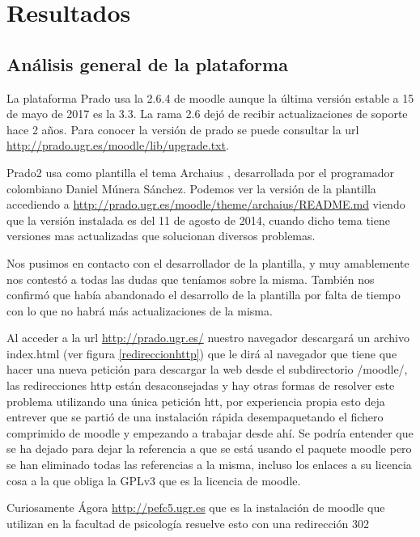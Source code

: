 \chapter{Resultados}

\section{Análisis general de la plataforma}

La plataforma Prado usa la 2.6.4 de moodle aunque la última versión estable a 15 de mayo de 2017 es la 3.3. La rama 2.6 dejó de recibir actualizaciones de soporte hace 2 años. Para conocer la versión de prado se puede consultar la url \url{http://prado.ugr.es/moodle/lib/upgrade.txt}.

\bigskip
Prado2 usa como plantilla el tema Archaius \cite{moodletheme}, desarrollada por el programador colombiano Daniel Múnera Sánchez. Podemos ver la versión de la plantilla accediendo a \url{http://prado.ugr.es/moodle/theme/archaius/README.md} viendo que la versión instalada es del 11 de agosto de 2014, cuando dicho tema tiene versiones mas actualizadas que solucionan diversos problemas.

\bigskip
Nos pusimos en contacto con el desarrollador de la plantilla, y muy amablemente nos contestó a todas las dudas que teníamos sobre la misma. También nos confirmó que había abandonado el desarrollo de la plantilla por falta de tiempo con lo que no habrá más actualizaciones de la misma.

\bigskip
Al acceder a la url \url{http://prado.ugr.es/} nuestro navegador descargará un archivo index.html (ver figura \ref{redireccionhttp}) que le dirá al navegador que tiene que hacer una nueva petición para descargar la web desde el subdirectorio /moodle/, las redirecciones http están desaconsejadas y hay otras formas de resolver este problema utilizando una única petición htt, por experiencia propia esto deja entrever que se partió de una instalación rápida desempaquetando el fichero comprimido de moodle y empezando a trabajar desde ahí. Se podría entender que se ha dejado para dejar la referencia a que se está usando el paquete moodle pero se han eliminado todas las referencias a la misma, incluso los enlaces a su licencia cosa a la que obliga la GPLv3 que es la licencia de moodle.

\bigskip
Curiosamente Ágora \url{http://pefc5.ugr.es} que es la instalación de moodle que utilizan en la facultad de psicología resuelve esto con una redirección 302

